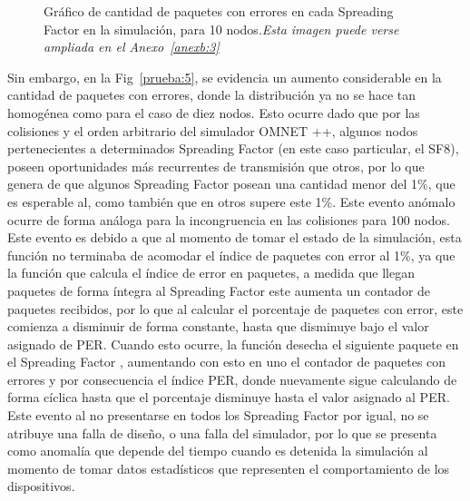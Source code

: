 \begin{justify}
\begin{figure}[!ht]
\caption{Gráfico de cantidad de paquetes con errores en cada Spreading Factor en la simulación, para 10 nodos.\textit{Esta imagen puede verse ampliada en el Anexo~\ref{anexb:3}}}
\label{prueba:4}
\end{figure}
Sin embargo, en la Fig~\ref{prueba:5}, se evidencia un aumento considerable en la cantidad de paquetes con errores, donde la distribución ya no se hace tan homogénea como para el caso de diez nodos. Esto ocurre dado que por las colisiones y el orden arbitrario del simulador OMNET ++, algunos nodos pertenecientes a determinados Spreading Factor (en este caso particular, el SF8), poseen oportunidades más recurrentes de transmisión que otros, por lo que genera de que algunos Spreading Factor posean una cantidad menor del 1\%, que es esperable al, como también que en otros supere este 1\%. Este evento anómalo ocurre de forma análoga para la incongruencia en las colisiones para 100 nodos.\\
Este evento  es debido a que al momento de tomar el estado de la simulación, esta función no terminaba de acomodar el índice de paquetes con error al 1\%, ya que la función que calcula el índice de error en paquetes, a medida que llegan paquetes de forma íntegra al Spreading Factor este aumenta un contador de paquetes recibidos, por lo que al calcular el porcentaje de paquetes con error, este comienza a disminuir de forma constante, hasta que disminuye bajo el valor asignado de PER. Cuando esto ocurre, la función desecha el siguiente paquete en el Spreading Factor , aumentando con esto en uno el contador de paquetes con errores y por consecuencia el índice PER, donde nuevamente sigue calculando de forma cíclica hasta que el porcentaje disminuye hasta el valor asignado al PER. Este evento al no presentarse en todos los Spreading Factor por igual, no se atribuye una falla de diseño, o una falla del simulador, por lo que se presenta como anomalía que depende del tiempo cuando es detenida la simulación al momento de tomar datos estadísticos que representen el comportamiento de los dispositivos.\\
\begin{figure}[!ht]
\centering

\end{figure}
\end{justify}
